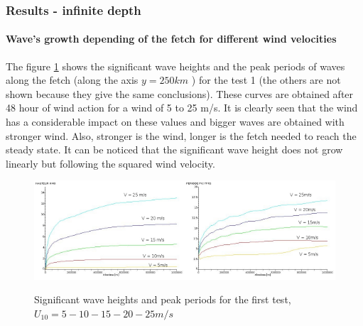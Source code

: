 \subsubsection{Results - infinite depth }
\paragraph{Wave's growth depending of the fetch for different wind velocities}
The figure \ref{hsfet} shows the significant wave heights and the peak periods of waves along the fetch (along the axis $ y = 250 km$ ) for the test 1 (the others are not shown because they give the same conclusions). These curves are obtained after 48 hour of wind action for a wind of 5 to 25 m/s. It is clearly seen that the wind has a considerable impact on these values and bigger waves are obtained with stronger wind. Also, stronger is the wind, longer is the fetch needed to reach the steady state. It can be noticed that the significant wave height does not grow linearly but following the squared wind velocity.
\begin{figure}[H]
  \centering
  	\includegraphics[width=0.5\textwidth]{Hm0_free_mesh.jpg}\includegraphics[width=0.5\textwidth]{Tp_free_mesh.jpg}
      \caption{Significant wave heights and peak periods for the first test, $U_{10} = 5 - 10 - 15 - 20 - 25 m/s$}
\label{hsfet}
\end{figure}
